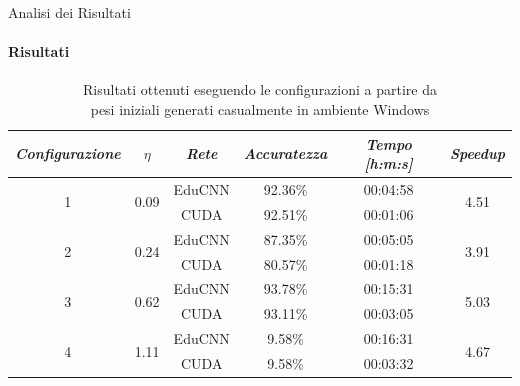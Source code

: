 \documentclass[
 ]{beamer}
\begin{document}
\begin{frame}{Analisi dei Risultati}
    \framesubtitle{Risultati}

           \begin{table}
            \centering
            \renewcommand\arraystretch{1.3}
            \small
            \begin{tabular}{| c | c | c | c | c | c |}
                \hline
                \emph{Configurazione} & $\eta$ & \emph{Rete} & \emph{Accuratezza} & \emph{Tempo [h:m:s]} & \emph{Speedup} \\
                \hline
                \multirow{2}{*}{1} & \multirow{2}{*}{0.09} & EduCNN & 92.36\% & 00:04:58 & \multirow{2}{*}{4.51} \\ \cline{3-5} 
                                   &                       & CUDA   & 92.51\% & 00:01:06 & \\
                \hline
                \multirow{2}{*}{2} & \multirow{2}{*}{0.24} & EduCNN & 87.35\% & 00:05:05 & \multirow{2}{*}{3.91} \\ \cline{3-5} 
                                   &                       & CUDA   & 80.57\% & 00:01:18  & \\
                \hline
                \multirow{2}{*}{3} & \multirow{2}{*}{0.62} & EduCNN & 93.78\% & 00:15:31 & \multirow{2}{*}{5.03} \\ \cline{3-5} 
                                   &                       & CUDA   & 93.11\% & 00:03:05 & \\
                \hline
                \multirow{2}{*}{4} & \multirow{2}{*}{1.11} & EduCNN & 9.58\% & 00:16:31 & \multirow{2}{*}{4.67} \\ \cline{3-5} 
                                   &                       & CUDA   & 9.58\%  & 00:03:32  & \\
                \hline
            \end{tabular}
            \caption                        
    {Risultati ottenuti eseguendo le configurazioni a partire da \\ pesi iniziali generati casualmente in ambiente Windows \endtabular}          
        \end{table}    
\end{frame}





\end{document}
